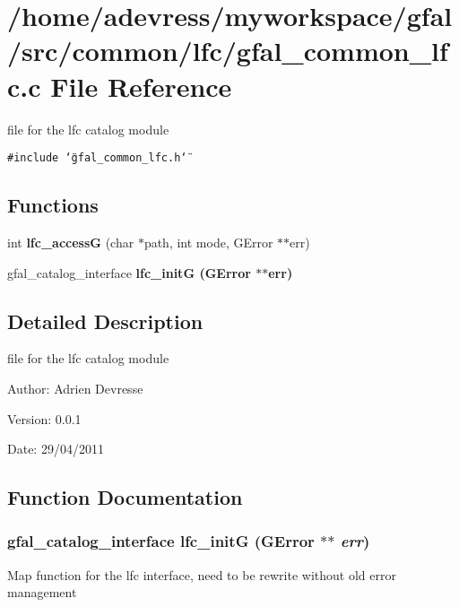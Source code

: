 \section{/home/adevress/myworkspace/gfal/src/common/lfc/gfal\_\-common\_\-lfc.c File Reference}
\label{gfal__common__lfc_8c}
file for the lfc catalog module 

{\tt \#include \char`\"{}gfal\_\-common\_\-lfc.h\char`\"{}}\par
\subsection*{Functions}
\begin{CompactItemize}
\item 
int \textbf{lfc\_\-access\-G} (char $\ast$path, int mode, GError $\ast$$\ast$err)\label{gfal__common__lfc_8c_b3ae591453bd31787bf8c2911ee7fa2d}

\item 
gfal\_\-catalog\_\-interface \bf{lfc\_\-init\-G} (GError $\ast$$\ast$err)
\end{CompactItemize}


\subsection{Detailed Description}
file for the lfc catalog module 

\begin{Desc}
\item[Author:]Adrien Devresse \end{Desc}
\begin{Desc}
\item[Version:]0.0.1 \end{Desc}
\begin{Desc}
\item[Date:]29/04/2011 \end{Desc}


\subsection{Function Documentation}
\subsubsection{\setlength{\rightskip}{0pt plus 5cm}gfal\_\-catalog\_\-interface lfc\_\-init\-G (GError $\ast$$\ast$ {\em err})}\label{gfal__common__lfc_8c_5124dd492c064ffa79a7e9c6ff82c97e}


Map function for the lfc interface, need to be rewrite without old error management 